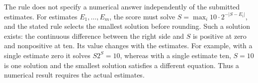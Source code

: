 The rule does not specify a numerical answer independently of the submitted estimates. For estimates $E_1,\ldots,E_m$, the score must solve $S=\max_i 10\cdot2^{-|S-E_i|}$, and the stated rule selects the smallest solution before rounding. Such a solution exists: the continuous difference between the right side and $S$ is positive at zero and nonpositive at ten. Its value changes with the estimates. For example, with a single estimate zero it solves $S2^S=10$, whereas with a single estimate ten, $S=10$ is one solution and the smallest solution satisfies a different equation. Thus a numerical result requires the actual estimates.
